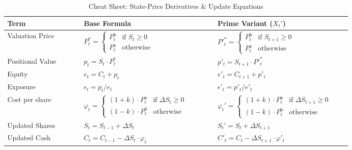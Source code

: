 \begin{table}[t!]
    \centering
    \label{tab:cheatsheet}
    \begin{tabular}{p{0.2\linewidth} p{0.35\linewidth} p{0.35\linewidth}}
        \toprule
        \textbf{Term} & \textbf{Base Formula} & \textbf{Prime Variant ($X_t'$)} \\
        \midrule
        
        Valuation Price & 
        $P^*_t = \begin{cases} P^{\text{b}}_t & \text{if } S_t \ge 0 \\ P^{\text{a}}_t & \text{otherwise} \end{cases}$ &
        $P'^*_t = \begin{cases} P^{\text{b}}_t & \text{if } S_{t+1} \ge 0 \\ P^{\text{a}}_t & \text{otherwise} \end{cases}$ \\
        
        \addlinespace[0.5em]
        
        Positional Value & 
        $p_t = S_t \cdot P^*_t$ &
        $p'_t = S_{t+1} \cdot P'^*_t$ \\

        \addlinespace[0.5em]

        Equity & 
        $e_t = C_t + p_t$ &
        $e'_t = C_{t+1} + p'_t$ \\

        \addlinespace[0.5em]

        Exposure & 
        $\epsilon_t = p_t / e_t$ &
        $\epsilon'_t = p'_t / e'_t$ \\

        \midrule

        Cost per share & 
        $\varphi_t = \begin{cases} (1+k) \cdot P_t^\text{a} & \text{if } \Delta S_t \ge 0 \\ (1-k) \cdot P_t^\text{b} & \text{otherwise} \end{cases}$ &
        $\varphi_t' = \begin{cases} (1+k) \cdot P_t^\text{a} & \text{if } \Delta S_{t+1} \ge 0 \\ (1-k) \cdot P_t^\text{b} & \text{otherwise} \end{cases}$ \\

        \addlinespace[0.5em]

        Updated Shares & 
        $S_t = S_{t-1} + \Delta S_t$ &
        $S_t' = S_t + \Delta S_{t+1}$ \\
        
        \addlinespace[0.5em]
        
        Updated Cash & 
        $C_t = C_{t-1} - \Delta S_t \cdot \varphi_t$ &
        $C'_t = C_t - \Delta S_{t+1} \cdot \varphi'_t$ \\

        \bottomrule
    \end{tabular}
    \caption{Cheat Sheet: State-Price Derivatives \& Update Equations}
\end{table}
